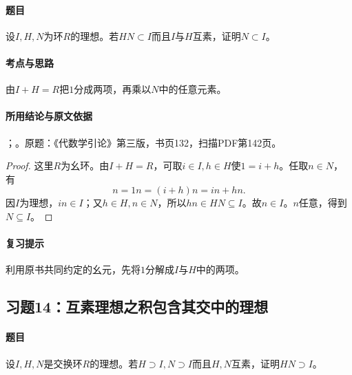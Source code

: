 \label{ex:3:13}

\paragraph{题目}

设$I,H,N$为环$R$的理想。若$HN\subset I$而且$I$与$H$互素，证明$N\subset I$。

\paragraph{考点与思路}

由$I+H=R$把$1$分成两项，再乘以$N$中的任意元素。

\paragraph{所用结论与原文依据}

；。原题：《代数学引论》第三版，书页132，扫描PDF第142页。


\begin{proof}

这里$R$为幺环。由$I+H=R$，可取$i\in I,h\in H$使$1=i+h$。任取$n\in N$，有
\[
n=1n=(i+h)n=in+hn.
\]
因$I$为理想，$in\in I$；又$h\in H,n\in N$，所以$hn\in HN\subseteq I$。故$n\in I$。$n$任意，得到$N\subseteq I$。

\end{proof}

\paragraph{复习提示}

利用原书共同约定的幺元，先将$1$分解成$I$与$H$中的两项。



\subsection{习题14：互素理想之积包含其交中的理想}

\label{ex:3:14}

\paragraph{题目}

设$I,H,N$是交换环$R$的理想。若$H\supset I,N\supset I$而且$H,N$互素，证明$HN\supset I$。

